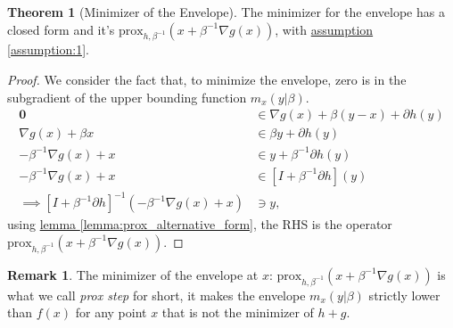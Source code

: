\documentclass[]{article}
\theoremstyle{definition}
\newtheorem{theorem}{Theorem}       %
\newtheorem{remark}{Remark}[subsection]
{
    \newtheorem{assumption}{Assumption}
}
\begin{document}
        \begin{theorem}[Minimizer of the Envelope]\label{thm:minimizer_envelope}
            The minimizer for the envelope has a closed form and it's $\text{prox}_{h, \beta^{-1}}(x + \beta^{-1}\nabla g(x))$, with \hyperref[assumption:1]{assumption \ref*{assumption:1}}. 
        \end{theorem}
        \begin{proof}
            We consider the fact that, to minimize the envelope, zero is in the subgradient of the upper bounding function $m_x(y|\beta)$. 
            \begin{align*}
                \mathbf 0 &\in 
                \nabla g(x) + {\beta}(y - x) + \partial h(y)
                \\
                \nabla g(x) + \beta x & \in
                \beta y + \partial h(y)
                \\
                -\beta^{-1} \nabla g(x) + x &\in y + \beta^{-1} \partial h(y)
                \\
                -\beta^{-1} \nabla g(x) + x &\in [I + \beta^{-1} \partial h](y)
                \\
                \implies
                [I + \beta^{-1}\partial h]^{-1}(- \beta^{-1} \nabla g(x) + x) 
                & \ni y,
            \end{align*}
            using \hyperref[lemma:prox_alternative_form]{lemma \ref*{lemma:prox_alternative_form}}, the RHS is the operator $\text{prox}_{h, \beta^{-1}}(x + \beta^{-1}\nabla g(x))$. 
        \end{proof}
        \begin{remark}
            The minimizer of the envelope at $x$: $\text{prox}_{h, \beta^{-1}}(x + \beta^{-1}\nabla g(x))$ is what we call \emph{prox step} for short, it makes the envelope $m_x(y|\beta)$ strictly lower than $f(x)$ for any point $x$ that is not the minimizer of $h + g$. 
        \end{remark}
\end{document}
